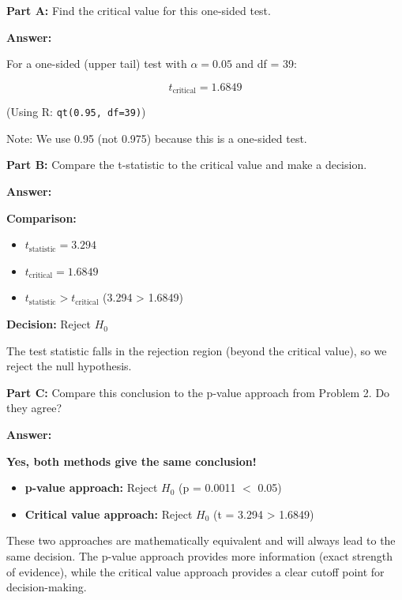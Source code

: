 \documentclass[11pt]{article}
\begin{document}
\vspace{6pt}

\textbf{Part A:} Find the critical value for this one-sided test.

\textcolor{answergreen}{\textbf{Answer:}}

For a one-sided (upper tail) test with $\alpha = 0.05$ and df = 39:

$$t_{\text{critical}} = 1.6849$$

(Using R: \texttt{qt(0.95, df=39)})

Note: We use 0.95 (not 0.975) because this is a one-sided test.

\vspace{6pt}

\textbf{Part B:} Compare the t-statistic to the critical value and make a decision.

\textcolor{answergreen}{\textbf{Answer:}}

\textbf{Comparison:}
\begin{itemize}
\item $t_{\text{statistic}} = 3.294$
\item $t_{\text{critical}} = 1.6849$
\item $t_{\text{statistic}} > t_{\text{critical}}$ (3.294 > 1.6849)
\end{itemize}

\textbf{Decision:} Reject $H_0$

The test statistic falls in the rejection region (beyond the critical value), so we reject the null hypothesis.

\vspace{6pt}

\textbf{Part C:} Compare this conclusion to the p-value approach from Problem 2. Do they agree?

\textcolor{answergreen}{\textbf{Answer:}}

\textbf{Yes, both methods give the same conclusion!}

\begin{itemize}
\item \textbf{p-value approach:} Reject $H_0$ (p = 0.0011 $<$ 0.05)
\item \textbf{Critical value approach:} Reject $H_0$ (t = 3.294 > 1.6849)
\end{itemize}

These two approaches are mathematically equivalent and will always lead to the same decision. The p-value approach provides more information (exact strength of evidence), while the critical value approach provides a clear cutoff point for decision-making.
\end{document}
